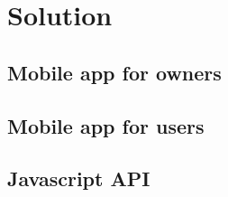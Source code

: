 
\chapter{Solution}
\label{chapter:solution}

\section{Mobile app for owners}
\label{sec:mobile_app_for_owners}

\section{Mobile app for users}
\label{sec:mobile_app_for_users}

\section{Javascript API}
\label{sec:javascript_api}
